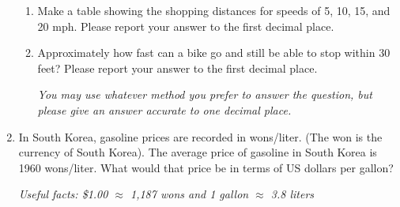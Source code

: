\documentclass[12pt]{article}
\begin{document}
\begin{enumerate}
\begin{enumerate}
\item Make a table showing the shopping distances for speeds of 5, 10, 15, and 20 mph.  Please report your answer to the first decimal place.
\vfill
\item Approximately how fast can a bike go and still be able to stop within 30 feet?   Please report your answer to the first decimal place.

\emph{You may use whatever method you prefer to answer the question, but please give an answer accurate to one decimal place.}
\vfill

\end{enumerate}

\noindent \hrulefill


\item In South Korea, gasoline prices are recorded in wons/liter.  (The won is the currency of South Korea).  The average price of gasoline in South Korea is 1960 wons/liter.  What would that price be in terms of US dollars per gallon?

\emph{Useful facts:  \$1.00 $\approx$ 1,187 wons and 1 gallon $\approx$ 3.8 liters }
\vfill


\end{enumerate}
\end{document}
